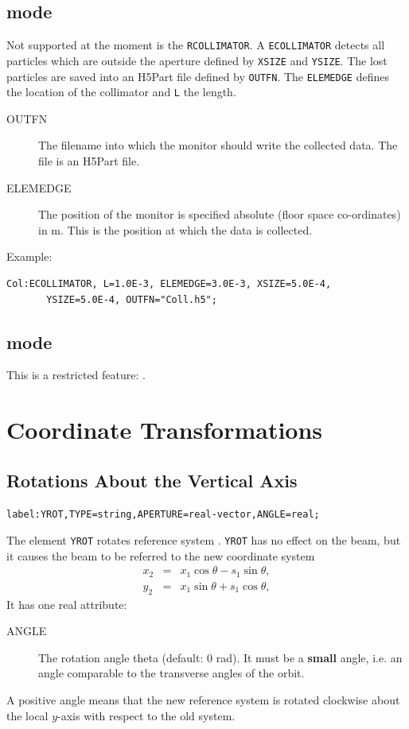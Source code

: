 \subsection{\opalt mode}
Not supported at the moment is the \texttt{RCOLLIMATOR}. A \texttt{ECOLLIMATOR} detects all particles which are outside the aperture defined by
\texttt{XSIZE} and \texttt{YSIZE}. The lost particles are saved  into an H5Part file defined by \texttt{OUTFN}.  The \texttt{ELEMEDGE} defines the
location of the collimator and \texttt{L} the length.
\begin{description}
\item[OUTFN]
  The filename into which the monitor should write the collected data. The file is an H5Part file.
\item[ELEMEDGE]
  The position of the monitor is specified absolute (floor space co-ordinates) in m. This is the position at which the data is collected.
\end{description}

\noindent Example:
\begin{verbatim}
Col:ECOLLIMATOR, L=1.0E-3, ELEMEDGE=3.0E-3, XSIZE=5.0E-4, 
       YSIZE=5.0E-4, OUTFN="Coll.h5";
\end{verbatim}


\subsection{\opalcycl mode}

This is a restricted feature: \noopalcycl .

\section{Coordinate Transformations}
\label{sec:rotation}

\subsection{Rotations About the Vertical Axis}
\label{sec:yrot}
\begin{verbatim}
label:YROT,TYPE=string,APERTURE=real-vector,ANGLE=real;
\end{verbatim}
The element \texttt{YROT} rotates reference system 
.
\texttt{YROT} has no effect on the beam,
but it causes the beam to be referred to the new coordinate system
\[\begin{array}{lcl}
  x_2&=&x_1\cos\theta-s_1\sin\theta, \\
  y_2&=&x_1\sin\theta+s_1\cos\theta,
\end{array}\]
It has one real attribute:
\begin{description}
\item[ANGLE]
  The rotation angle theta (default: 0 rad).
  It must be a \textbf{small} angle,
  i.e. an angle comparable to the transverse angles of the orbit.
\end{description}
A positive angle means that the new reference system is rotated
clockwise about the local $y$-axis with respect to the old system.

